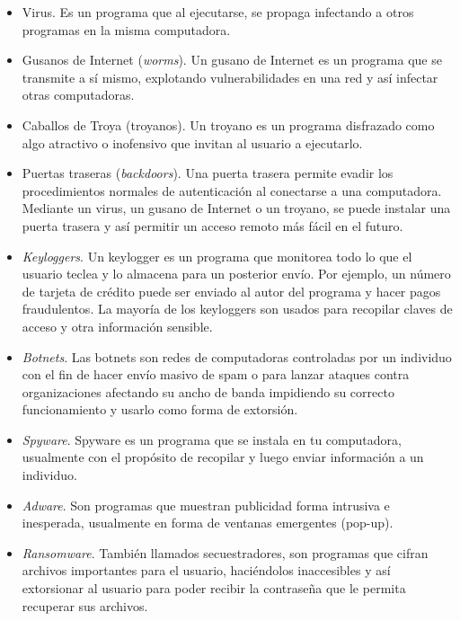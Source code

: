 \begin{itemize}

\item Virus. Es un programa que al ejecutarse, se propaga infectando a otros 
programas en la misma computadora.

\item Gusanos de Internet (\emph{worms}). Un gusano de Internet es un programa 
que se transmite a sí mismo, explotando vulnerabilidades en una red y así 
infectar otras computadoras.

\item Caballos de Troya (troyanos). Un troyano es un programa disfrazado como 
algo atractivo o inofensivo que invitan al usuario a ejecutarlo.

\item Puertas traseras (\emph{backdoors}). Una puerta trasera permite evadir 
los procedimientos normales de autenticación al conectarse a una computadora. 
Mediante un virus, un gusano de Internet o un troyano, se puede instalar una 
puerta trasera y así permitir un acceso remoto más fácil en el futuro.

\item \emph{Keyloggers}. Un keylogger es un programa que monitorea todo lo que 
el usuario teclea y lo almacena para un posterior envío. Por ejemplo, un número 
de tarjeta de crédito puede ser enviado al autor del programa y hacer pagos 
fraudulentos. La mayoría de los keyloggers son usados para recopilar claves de 
acceso y otra información sensible.

\item \emph{Botnets}. Las botnets son redes de computadoras controladas por un 
individuo con el fin de hacer envío masivo de spam o para lanzar ataques contra 
organizaciones afectando su ancho de banda impidiendo su correcto funcionamiento 
y usarlo como forma de extorsión.

\item \emph{Spyware}. Spyware es un programa que se instala en tu computadora, 
usualmente con el propósito de recopilar y luego enviar información a un 
individuo. 

\item \emph{Adware}. Son programas que muestran publicidad forma intrusiva e 
inesperada, usualmente en forma de ventanas emergentes (pop-up).

\item \emph{Ransomware}. También llamados secuestradores, son programas que 
cifran archivos importantes para el usuario, haciéndolos inaccesibles y así 
extorsionar al usuario para poder recibir la contraseña que le permita recuperar 
sus archivos.

\end{itemize}

